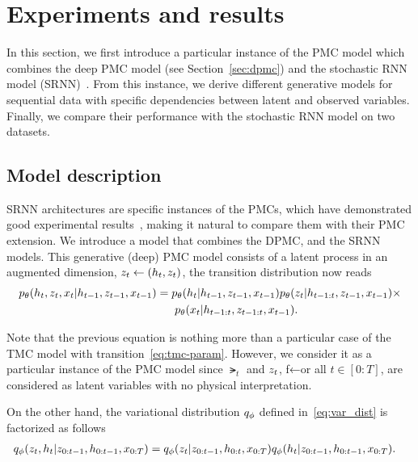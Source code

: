 
\section{Experiments and results}
In this section, we first introduce a particular instance of the PMC model
which combines the deep PMC model (see Section~\ref{sec:dpmc}) 
and the stochastic RNN model (SRNN)~\citep{bayer2015learning, chung2015recurrent}.
From this instance, we derive different generative models for sequential data
with specific dependencies between latent and observed variables.
Finally, we compare their performance with
the stochastic RNN model on two datasets.


\subsection{Model description}
SRNN  architectures are specific instances of the PMCs,
which have demonstrated good experimental results~\citep{bayer2015learning, chung2015recurrent}, 
making it natural to compare them with their PMC extension. 
We introduce a model that combines the DPMC, and 
the SRNN models.
This generative (deep) PMC model consists of a latent process 
in an augmented dimension,  $z_t \leftarrow (h_t,z_t)$,
the transition distribution now reads 
\begin{align}
    \label{eq:tmc-param}
    p_{\theta}(h_t,z_t,x_t|h_{t-1},z_{t-1},x_{t-1}) = &\; p_{\theta}(h_t|h_{t-1},z_{t-1},x_{t-1}) p_{\theta}(z_t|h_{t-1:t},z_{t-1},x_{t-1}) \times \nonumber \\
    & \; \; p_{\theta}(x_t|h_{t-1:t},z_{t-1:t},x_{t-1}) \text{.}
\end{align}
\begin{remark}
    Note that the previous equation  is nothing more than a particular case of the TMC model
    with transition~\eqref{eq:tmc-param}.    
    However, we consider it as a particular instance of the PMC model
    since $\lat_t$ and $z_t$, f←or all $t \in [0:T]$, are considered as latent variables
    with no physical interpretation.
\end{remark}
On the other hand, the variational distribution $q_\phi$ defined in~\eqref{eq:var_dist}
is factorized as follows
\begin{align*}
    \q(\latent_{t}, \lat_{t} | \latent_{0:t-1},  \lat_{0:t-1},\obs_{0:T}) &= 
    \q(\latent_{t} | \latent_{0:t-1},  \lat_{0:t},\obs_{0:T}) 
    \q(\lat_{t} | \latent_{0:t-1},  \lat_{0:t-1},\obs_{0:T}) \text{.}  %
\end{align*}

